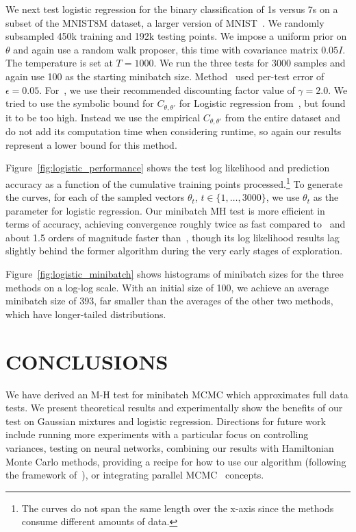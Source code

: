 \documentclass[twoside]{article} \usepackage{aistats2017}
\begin{document}
We next test logistic regression for the binary classification of 1s
versus 7s on a subset of the MNIST8M dataset, a larger version of
MNIST~\citep{lecun-mnisthandwrittendigit-2010}. We randomly subsampled
450k training and 192k testing points.
We impose a uniform prior on $\theta$ and again use a random walk
proposer, this time with covariance matrix $0.05I$. The temperature is
set at $T=1000$. We run the three tests for 3000 samples and again use 100
as the starting minibatch size. Method~\citet{cutting_mh_2014} used
per-test error of $\epsilon=0.05$.  For~\citet{icml2014c1_bardenet14},
we use their recommended discounting factor value of $\gamma=2.0$. We tried to use the
symbolic bound for $C_{\theta,\theta'}$ for Logistic regression
from~\citet{icml2014c1_bardenet14}, but found it to be too high. Instead we use
the empirical $C_{\theta,\theta'}$ from the entire dataset and do not add its
computation time when considering runtime, so again our results represent a
lower bound for this method.

Figure~\ref{fig:logistic_performance} shows the test log likelihood and
prediction accuracy as a function of the cumulative training points
processed.\footnote{The curves do not span the same length over the x-axis since
the methods consume different amounts of data.} To generate the curves, for each
of the sampled vectors $\theta_t$, $t\in\{1,\ldots,3000\}$, we use $\theta_t$ as
the parameter for logistic regression.  Our minibatch MH test is more efficient
in terms of accuracy, achieving convergence roughly twice as fast compared
to~\citet{cutting_mh_2014} and about 1.5 orders of magnitude faster
than~\citet{icml2014c1_bardenet14}, though its log likelihood results lag
slightly behind the former algorithm during the very early stages of
exploration.

Figure~\ref{fig:logistic_minibatch} shows histograms of minibatch sizes for the
three methods on a log-log scale. With an initial size of 100, we achieve an
average minibatch size of 393, far smaller than the averages of the other two
methods, which have longer-tailed distributions.



\section{CONCLUSIONS}\label{sec:conclusion}

We have derived an M-H test for minibatch MCMC which approximates full data
tests. We present theoretical results and experimentally show the benefits of
our test on Gaussian mixtures and logistic regression. Directions for future
work include running more experiments with a particular focus on controlling
variances, testing on neural networks, combining our results with Hamiltonian
Monte Carlo methods, providing a recipe for how to use our algorithm (following
the framework of~\citet{sgmcmc_2015}), or integrating parallel
MCMC~\citep{conf/uai/AngelinoKWSA14,conf/icml/AhnSW14} concepts.
\end{document}
